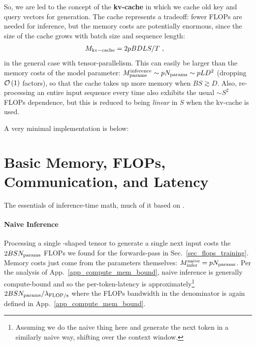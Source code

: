 \documentclass[11pt]{article}
\begin{document}
So, we are led to the concept of the \textbf{kv-cache} in which we cache old key and query vectors for generation.
The cache represents a tradeoff: fewer FLOPs are needed for inference, but the memory costs are potentially
enormous, since the size of the cache grows with batch size and sequence length:
\begin{align}
    M _{ {\rm kv-cache}  } &= 2pBDLS /T\ ,  \label{eq_kv_cache_memory}
\end{align}
in the general case with tensor-parallelism. This can easily be larger than the memory costs of the
model parameter: $ M _{ {\rm params}  } ^{ {\rm  inference}  } \sim p N _{ {\rm params}  } \sim p LD
^{ 2 }  $ (dropping $ \mathcal{O} \left( 1 \right)  $ factors), so that the cache takes up more memory
when $ BS \gtrsim D $. Also, re-processing an entire input sequence every time also exhibits the
usual $\sim S ^{ 2 }  $ FLOPs dependence, but this is reduced to being \textit{linear} in $ S $
when the kv-cache is used.


A very minimal implementation is below:


\section{Basic Memory, FLOPs, Communication, and Latency}

The essentials of inference-time math, much of it based on \cite{kipply_inference_math}.

\paragraph{Naive Inference} Processing a single -shaped tensor to generate a single
next input costs the $ 2BSN _{ {\rm params}  } $ FLOPs we found for the forwards-pass in
Sec.~\ref{sec_flops_training}. Memory costs just come from the parameters themselves: $ M _{ {\rm
infer}  }^{ {\rm naive}  }=pN _{ {\rm params}  } $. Per the analysis of App.~\ref{app_compute_mem_bound},
naive inference is generally compute-bound and so the per-token-latency is approximately\footnote{Assuming we
do the naive thing here and generate the next token in a similarly naive way, shifting over the
context window.}  $  2BSN _{ {\rm params}  }/ \lambda _{ {\rm FLOP/s}  } $ where the FLOPs bandwidth
in the denominator is again defined in App.~\ref{app_compute_mem_bound}.
\end{document}
